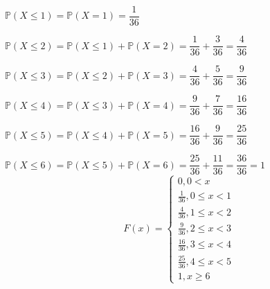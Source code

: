 \documentclass[12pt,a4paper]{article}
\begin{document}
\begin{center}
	\vspace{0.25cm}
	$\mathbb{P}(X\leq{1}) = \mathbb{P}(X=1) = \dfrac{1}{36}$
	
	\vspace{0.5cm}
	$\mathbb{P}(X\leq2) = \mathbb{P}(X\leq{1}) + \mathbb{P}(X=2) = \dfrac{1}{36} + \dfrac{3}{36} = \dfrac{4}{36}$
	
	\vspace{0.5cm}
	$\mathbb{P}(X\leq{3}) = \mathbb{P}(X\leq2) + \mathbb{P}(X=3) = \dfrac{4}{36} + \dfrac{5}{36} = \dfrac{9}{36}$
	
	\vspace{0.5cm}
	$\mathbb{P}(X\leq{4}) = \mathbb{P}(X\leq{3}) + \mathbb{P}(X=4) = \dfrac{9}{36} + \dfrac{7}{36} = \dfrac{16}{36}$
	
	\vspace{0.5cm}
	$\mathbb{P}(X\leq{5}) = \mathbb{P}(X\leq{4}) + \mathbb{P}(X=5) = \dfrac{16}{36} + \dfrac{9}{36} = \dfrac{25}{36}$
	
	\vspace{0.5cm}
	$\mathbb{P}(X\leq{6}) = \mathbb{P}(X\leq{5}) + \mathbb{P}(X=6) = \dfrac{25}{36} + \dfrac{11}{36} = \dfrac{36}{36} = 1$
	\[
	F(x) =
	\begin{cases}
	0, 0 < x \\
	\frac{1}{36}, 0\leq{x} < 1 \\
	\frac{4}{36}, 1\leq{x} < 2\\
	\frac{9}{36}, 2\leq{x} < 3\\
	\frac{16}{36}, 3\leq{x} < 4\\
	\frac{25}{36}, 4\leq{x} < 5\\
	1,x\geq{6}
	\end{cases}
	\]
	
	\vspace{1cm}
\end{center}
\end{document}
